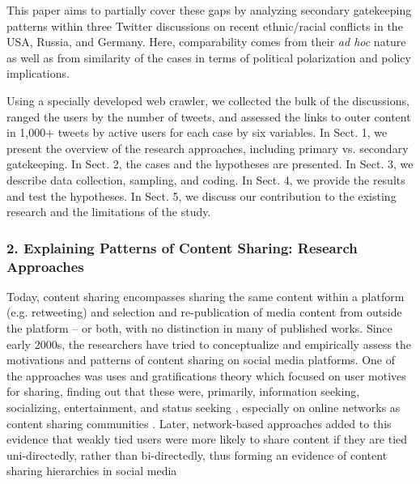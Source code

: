 This paper aims to partially cover these gaps by analyzing secondary gatekeeping patterns within three Twitter discussions on recent ethnic/racial conflicts in the USA, Russia, and Germany. Here, comparability comes from their \textit{ad hoc} nature \cite{BrunsBurgess} as well as from similarity of the cases in terms of political polarization and policy implications.

Using a specially developed web crawler, we collected the bulk of the discussions, ranged the users by the number of tweets, and assessed the links to outer content in 1,000+ tweets by active users for each case by six variables. In Sect. 1, we present the overview of the research approaches, including primary vs. secondary gatekeeping. In Sect. 2, the cases and the hypotheses are presented. In Sect. 3, we describe data collection, sampling, and coding. In Sect. 4, we provide the results and test the hypotheses. In Sect. 5, we discuss our contribution to the existing research and the limitations of the study.

\subsubsection{2. Explaining Patterns of Content Sharing: Research Approaches}

Today, content sharing encompasses sharing the same content within a platform (e.g. retweeting) and selection and re-publication of media content from outside the platform -- or both, with no distinction in many of published works. Since early 2000s, the researchers have tried to conceptualize and empirically assess the motivations and patterns of content sharing on social media platforms. One of the approaches was uses and gratifications theory which focused on user motives for sharing, finding out that these were, primarily, information seeking, socializing, entertainment, and status seeking  \cite{LeeMa}, especially on online networks as content sharing communities \cite{LeeAntoniadisSalamatian}. Later, network-based approaches added to this evidence that weakly tied users were more likely to share content if they are tied uni-directedly, rather than bi-directedly, thus forming an evidence of content sharing hierarchies in social media \cite{ShiRuiWhinston}

